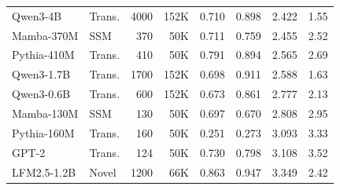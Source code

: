 \documentclass{article}
\begin{document}
\begin{table}[h]
\begin{tabular}{llrrrrrr}
Qwen3-4B & Trans. & 4000 & 152K & 0.710 & 0.898 & 2.422 & 1.55 \\
Mamba-370M & SSM & 370 & 50K & 0.711 & 0.759 & 2.455 & 2.52 \\
Pythia-410M & Trans. & 410 & 50K & 0.791 & 0.894 & 2.565 & 2.69 \\
Qwen3-1.7B & Trans. & 1700 & 152K & 0.698 & 0.911 & 2.588 & 1.63 \\
Qwen3-0.6B & Trans. & 600 & 152K & 0.673 & 0.861 & 2.777 & 2.13 \\
Mamba-130M & SSM & 130 & 50K & 0.697 & 0.670 & 2.808 & 2.95 \\
Pythia-160M & Trans. & 160 & 50K & 0.251 & 0.273 & 3.093 & 3.33 \\
GPT-2 & Trans. & 124 & 50K & 0.730 & 0.798 & 3.108 & 3.52 \\
LFM2.5-1.2B & Novel & 1200 & 66K & 0.863 & 0.947 & 3.349 & 2.42 \\
\bottomrule
\end{tabular}
\end{table}
\end{document}
